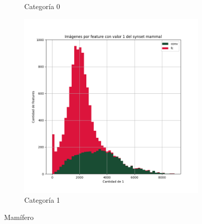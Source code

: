 \documentclass[12,twoside]{TFG-GM}
\theoremstyle{definition}
\theoremstyle{remark}
\begin{document}
\begin{figure}[ht]
\begin{subfigure}[b]{0.3\textwidth}
		\caption{Categoría 0}
	\end{subfigure}
	\begin{subfigure}[b]{0.3\textwidth}
		\includegraphics[width=\textwidth]  {Images/plots/25/synsets/Images_per_feature_of_1_category_mammalall_layers.png}
		\caption{Categoría 1}
	\end{subfigure}       
	\caption{Mamífero}
\end{figure}
\end{document}
